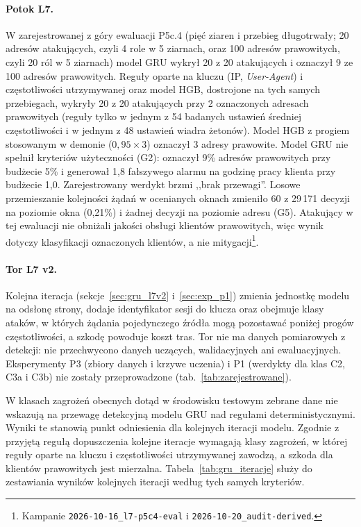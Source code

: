 \documentclass[a4paper,12pt]{article}
\begin{document}
\paragraph{Potok L7.} W zarejestrowanej z góry ewaluacji P5c.4 (pięć ziaren i przebieg długotrwały; 20 adresów atakujących, czyli 4 role w 5 ziarnach, oraz 100 adresów prawowitych, czyli 20 ról w 5 ziarnach) model GRU wykrył 20 z 20 atakujących i oznaczył 9 ze 100 adresów prawowitych. Reguły oparte na kluczu (IP, \textit{User-Agent}) i częstotliwości utrzymywanej oraz model HGB, dostrojone na tych samych przebiegach, wykryły 20 z 20 atakujących przy 2 oznaczonych adresach prawowitych (reguły tylko w jednym z 54 badanych ustawień średniej częstotliwości i w jednym z 48 ustawień wiadra żetonów). Model HGB z progiem stosowanym w demonie ($0{,}95 \times 3$) oznaczył 3 adresy prawowite. Model GRU nie spełnił kryteriów użyteczności (G2): oznaczył 9\% adresów prawowitych przy budżecie 5\% i generował 1,8 fałszywego alarmu na godzinę pracy klienta przy budżecie 1,0. Zarejestrowany werdykt brzmi ,,brak przewagi''. Losowe przemieszanie kolejności żądań w ocenianych oknach zmieniło 60 z 29\,171 decyzji na poziomie okna (0,21\%) i żadnej decyzji na poziomie adresu (G5). Atakujący w tej ewaluacji nie obniżali jakości obsługi klientów prawowitych, więc wynik dotyczy klasyfikacji oznaczonych klientów, a nie mitygacji\footnote{\raggedright Kampanie \texttt{2026-10-16\_l7-p5c4-eval} i \texttt{2026-10-20\_audit-derived}.}.

\paragraph{Tor L7 v2.} Kolejna iteracja (sekcje~\ref{sec:gru_l7v2} i~\ref{sec:exp_p1}) zmienia jednostkę modelu na odsłonę strony, dodaje identyfikator sesji do klucza oraz obejmuje klasy ataków, w których żądania pojedynczego źródła mogą pozostawać poniżej progów częstotliwości, a szkodę powoduje koszt tras. Tor nie ma danych pomiarowych z detekcji: nie przechwycono danych uczących, walidacyjnych ani ewaluacyjnych. Eksperymenty P3 (zbiory danych i krzywe uczenia) i P1 (werdykty dla klas C2, C3a i C3b) nie zostały przeprowadzone (tab.~\ref{tab:zarejestrowane}).

W klasach zagrożeń obecnych dotąd w środowisku testowym zebrane dane nie wskazują na przewagę detekcyjną modelu GRU nad regułami deterministycznymi. Wyniki te stanowią punkt odniesienia dla kolejnych iteracji modelu. Zgodnie z przyjętą regułą dopuszczenia kolejne iteracje wymagają klasy zagrożeń, w której reguły oparte na kluczu i częstotliwości utrzymywanej zawodzą, a szkoda dla klientów prawowitych jest mierzalna. Tabela~\ref{tab:gru_iteracje} służy do zestawiania wyników kolejnych iteracji według tych samych kryteriów.
\end{document}

